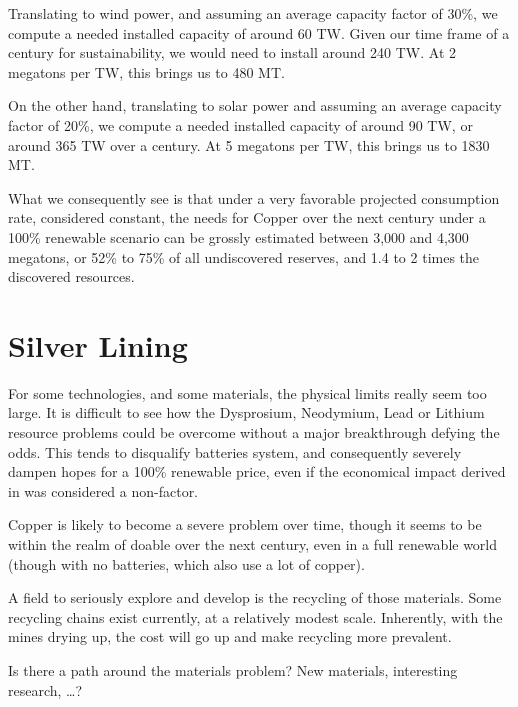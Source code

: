 Translating to wind power, and assuming an average capacity factor of 30\%, we compute a needed installed capacity of around 60 TW. Given our time frame of a century for sustainability, we would need to install around 240 TW. At 2 megatons per TW, this brings us to 480 MT.

On the other hand, translating to solar power and assuming an average capacity factor of 20\%, we compute a needed installed capacity of around 
90 TW, or around 365 TW over a century. At 5 megatons per TW, this brings us to 1830 MT.

What we consequently see is that under a very favorable projected consumption rate, considered constant, the needs for Copper over the next century under a 100\% renewable scenario can be grossly estimated between 3,000 and 4,300 megatons, or 52\% to 75\% of all undiscovered reserves, and 1.4 to 2 times the discovered resources.


\section{Silver Lining}

For some technologies, and some materials, the physical limits really seem too large. It is difficult to see how the Dysprosium, Neodymium, Lead or Lithium resource problems could be overcome without a major breakthrough defying the odds. This tends to disqualify batteries system, and consequently severely dampen hopes for a 100\% renewable price, even if the economical impact derived in  was considered a non-factor.

Copper is likely to become a severe problem over time, though it seems to be within the realm of doable over the next century, even in a full renewable world (though with no batteries, which also use a lot of copper).

A field to seriously explore and develop is the recycling of those materials. Some recycling chains exist currently, at a relatively modest scale. Inherently, with the mines drying up, the cost will go up and make recycling more prevalent.

\begin{kaobox}[frametitle=TO-DO]
Is there a path around the materials problem? New materials, interesting research, \ldots ?
\end{kaobox}

